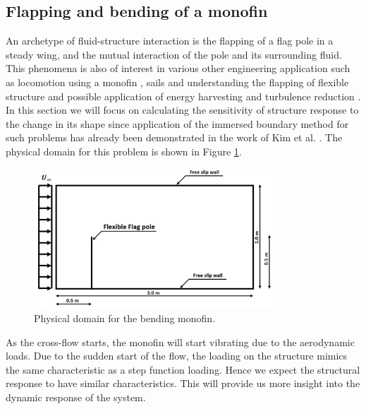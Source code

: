 \subsection{Flapping and bending of a monofin}
An archetype of fluid-structure interaction is the flapping of a flag pole in a steady wing, and the mutual interaction of the pole and its surrounding fluid. This phenomena is also of interest in various other engineering application such as locomotion using a monofin \cite{luersen2006computationally}, sails and understanding the flapping of flexible structure and possible application of energy harvesting \cite{allen2001energy} and turbulence reduction \cite{shen2003turbulent}. In this section we will focus on calculating the sensitivity of structure response to the change in its shape since application of the immersed boundary method for such problems has already been demonstrated in the work of Kim et al. \cite{kim2007penalty}. The physical domain for this problem is shown in Figure \ref{fig:C5_flagPolePhysical}.
%
\begin{figure}[H]
    \centering
    \includegraphics[width=9.00cm]{Chapter_5/figure/flagPole_domain_shape.jpg}
    \caption{Physical domain for the bending monofin.}
    \label{fig:C5_flagPolePhysical}
\end{figure}
%
As the cross-flow starts, the monofin will start vibrating due to the aerodynamic loads. Due to the sudden start of the flow, the loading on the structure mimics the same characteristic as a step function loading. Hence we expect the structural response to have similar characteristics. This will provide us more insight into the dynamic response of the system. 

